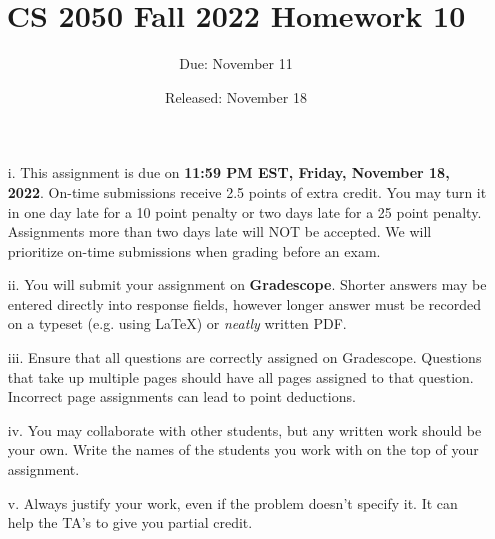 \documentclass{article}
\title{CS 2050 Fall 2022 Homework 10}
\author{Due: November 11}
\date{Released: November 18}
\begin{document}
\maketitle

\begin{enumerate}
    \item[i.] This assignment is due on \textbf{11:59 PM EST, Friday, November 18, 2022}.  On-time submissions receive 2.5 points of extra credit. You may turn it in one day late for a 10 point penalty or two days late for a 25 point penalty. Assignments more than two days late will NOT be accepted.  We will prioritize on-time submissions when grading before an exam.
    \item[ii.] You will submit your assignment on \textbf{Gradescope}. Shorter answers may be entered directly into response fields, however longer answer must be recorded on a typeset (e.g. using \LaTeX) or \emph{neatly} written PDF.
    \item[iii.] Ensure that all questions are correctly assigned on Gradescope. Questions that take up multiple pages should have all pages assigned to that question. Incorrect page assignments can lead to point deductions.
    \item[iv.] You may collaborate with other students, but any written work should be your own. Write the names of the students you work with on the top of your assignment.
    \item[v.] Always justify your work, even if the problem doesn't specify it. It can help the TA's to give you partial credit.
\end{enumerate}
\end{document}
